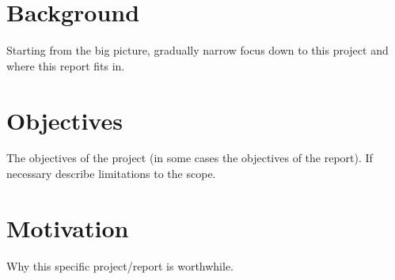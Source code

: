 \section{Background}

Starting from the big picture, gradually narrow focus down to this project and where this report fits in.

\section{Objectives}

The objectives of the project (in some cases the objectives of the report). If necessary describe limitations to the scope.

\section{Motivation}

Why this specific project/report is worthwhile.